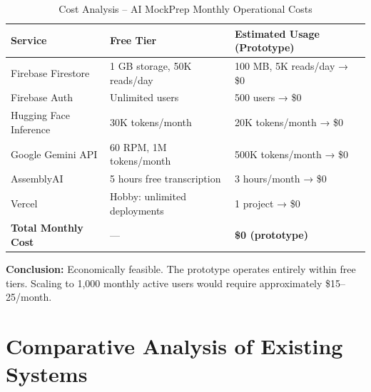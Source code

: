 \documentclass[12pt,a4paper,oneside]{report}
\begin{document}
\begin{table}[H]
\centering
\caption{Cost Analysis -- AI MockPrep Monthly Operational Costs}
\label{tab:cost_analysis}
\begin{tabular}{|p{4cm}|p{4cm}|p{5.5cm}|}
\hline
\textbf{Service} & \textbf{Free Tier} & \textbf{Estimated Usage (Prototype)} \\
\hline
Firebase Firestore & 1 GB storage, 50K reads/day & 100 MB, 5K reads/day → \$0 \\
\hline
Firebase Auth & Unlimited users & 500 users → \$0 \\
\hline
Hugging Face Inference & 30K tokens/month & 20K tokens/month → \$0 \\
\hline
Google Gemini API & 60 RPM, 1M tokens/month & 500K tokens/month → \$0 \\
\hline
AssemblyAI & 5 hours free transcription & 3 hours/month → \$0 \\
\hline
Vercel & Hobby: unlimited deployments & 1 project → \$0 \\
\hline
\textbf{Total Monthly Cost} & --- & \textbf{\$0 (prototype)} \\
\hline
\end{tabular}
\end{table}

\textbf{Conclusion:} Economically feasible. The prototype operates entirely within free tiers. Scaling to 1,000 monthly active users would require approximately \$15--25/month.

\section{Comparative Analysis of Existing Systems}
\end{document}
